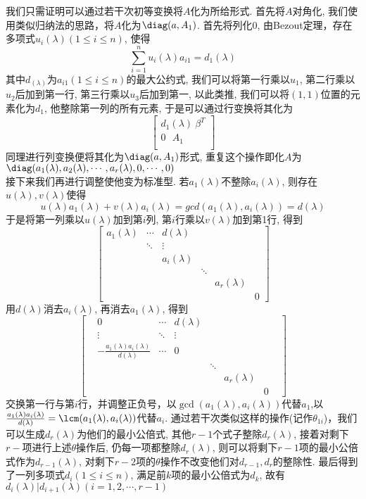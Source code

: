 \documentclass[UTF8]{ctexart}
\begin{document}
        \begin{prf}
            我们只需证明可以通过若干次初等变换将$A$化为所给形式. 首先将$A$对角化, 我们使用类似归纳法的思路，将$A$化为$\diag(a,A_1)$.
            首先将列化0, 由Bezout定理，存在多项式$u_i(\lambda)(1\leq i\leq n)$, 使得
            \[\sum_{i=1}^nu_i(\lambda)a_{i1}=d_1(\lambda)\]
            其中$d_(\lambda)$为$a_{i1}(1\leq i\leq n)$的最大公约式, 我们可以将第一行乘以$u_1$, 第二行乘以$u_2$后加到第一行, 第三行乘以$u_3$后加到第一, 以此类推, 我们可以将$(1,1)$位置的元素化为$d_1$, 他整除第一列的所有元素, 于是可以通过行变换将其化为
            \[\begin{bmatrix}
                d_1(\lambda)\  \beta^{T}\\
                0 \ \ \  A_1\\
            \end{bmatrix}\]
            同理进行列变换便将其化为$\diag(a,A_1)$形式, 重复这个操作即化$A$为$\diag(a_1(\lambda),a_2(\lambda),\cdots,a_r(\lambda),0,\cdots,0)$\\
            接下来我们再进行调整使他变为标准型. 若$a_1(\lambda)$不整除$a_i(\lambda)$, 则存在$u(\lambda),v(\lambda)$使得\[
            u(\lambda)a_1(\lambda)+v(\lambda)a_i(\lambda)=gcd(a_1(\lambda),a_i(\lambda))=d(\lambda)
            \]
            于是将第一列乘以$u(\lambda)$加到第$i$列, 第$i$行乘以$v(\lambda)$加到第1行, 得到
            \[\begin{bmatrix}a_1(\lambda)&\cdots&d(\lambda)\\
            &\ddots&\vdots\\
            &&a_i(\lambda)\\
            &&&\ddots\\
            &&&&a_r(\lambda)\\
            &&&&&0
            \end{bmatrix}
            \]
            用$d(\lambda)$消去$a_i(\lambda)$, 再消去$a_1(\lambda)$, 得到
            \[\begin{bmatrix}
            &0&\cdots&d(\lambda)&&&&\\
            &\vdots&\ddots&\vdots&&&&\\
            &-\frac{a_1(\lambda)a_i(\lambda)}{d(\lambda)}&\cdots &0&&&&\\
            &&&&\ddots&&&\\
            &&&&&a_r(\lambda)&&\\
            &&&&&&0
            \end{bmatrix}\]
            交换第一行与第$i$行，并调整正负号，以$\gcd(a_1(\lambda),a_i(\lambda))$代替$a_1$,以$\frac{a_1(\lambda)a_i(\lambda)}{d(\lambda)}=\lcm(a_1(\lambda),a_i(\lambda))$代替$a_i$.
            通过若干次类似这样的操作(记作$\theta_{1i}$)，我们可以生成$d_r(\lambda)$为他们的最小公倍式, 其他$r-1$个式子整除$d_r(\lambda)$, 接着对剩下$r-$项进行上述$\theta$操作后, 仍每一项都整除$d_r(\lambda)$, 则可以将剩下$r-1$项的最小公倍式作为$d_{r-1}(\lambda)$, 对剩下$r-2$项的$\theta$操作不改变他们对$d_{r-1},d_r$的整除性. 最后得到了一列多项式$d_i(1\leq i\leq n)$, 满足前$k$项的最小公倍式为$d_k$, 故有$d_{i}(\lambda)|d_{i+1}(\lambda)(i=1,2,\cdots,r-1)$
        \end{prf}
\end{document}
